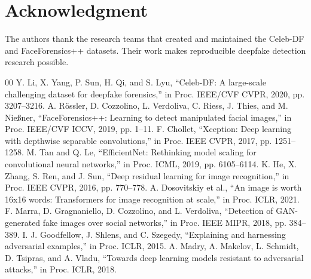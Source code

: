 \documentclass[runningheads]{llncs}
\begin{document}
\section*{Acknowledgment}
The authors thank the research teams that created and maintained the Celeb-DF and FaceForensics++ datasets. Their work makes reproducible deepfake detection research possible.

\begin{thebibliography}{00}
 Y. Li, X. Yang, P. Sun, H. Qi, and S. Lyu, ``Celeb-DF: A large-scale challenging dataset for deepfake forensics,'' in Proc. IEEE/CVF CVPR, 2020, pp. 3207--3216.
 A. R\"ossler, D. Cozzolino, L. Verdoliva, C. Riess, J. Thies, and M. Nie{\ss}ner, ``FaceForensics++: Learning to detect manipulated facial images,'' in Proc. IEEE/CVF ICCV, 2019, pp. 1--11.
 F. Chollet, ``Xception: Deep learning with depthwise separable convolutions,'' in Proc. IEEE CVPR, 2017, pp. 1251--1258.
 M. Tan and Q. Le, ``EfficientNet: Rethinking model scaling for convolutional neural networks,'' in Proc. ICML, 2019, pp. 6105--6114.
 K. He, X. Zhang, S. Ren, and J. Sun, ``Deep residual learning for image recognition,'' in Proc. IEEE CVPR, 2016, pp. 770--778.
 A. Dosovitskiy et al., ``An image is worth 16x16 words: Transformers for image recognition at scale,'' in Proc. ICLR, 2021.
 F. Marra, D. Gragnaniello, D. Cozzolino, and L. Verdoliva, ``Detection of GAN-generated fake images over social networks,'' in Proc. IEEE MIPR, 2018, pp. 384--389.
 I. J. Goodfellow, J. Shlens, and C. Szegedy, ``Explaining and harnessing adversarial examples,'' in Proc. ICLR, 2015.
 A. Madry, A. Makelov, L. Schmidt, D. Tsipras, and A. Vladu, ``Towards deep learning models resistant to adversarial attacks,'' in Proc. ICLR, 2018.
\end{thebibliography}
\end{document}
